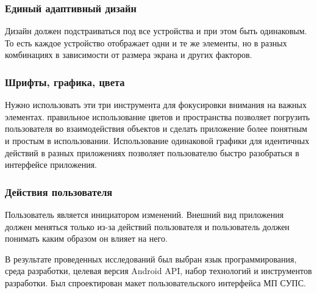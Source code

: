 \subsubsection*{Единый адаптивный дизайн}
Дизайн должен подстраиваться под все устройства и при этом быть одинаковым.
То есть каждое устройство отображает одни и те же элементы, но в разных комбинациях в зависимости от размера экрана и других факторов.

\subsubsection*{Шрифты, графика, цвета}
Нужно использовать эти три инструмента для фокусировки внимания на важных элементах.
правильное использование цветов и пространства позволяет погрузить пользователя во взаимодействия объектов и сделать приложение более понятным и простым в использовании.
Использование одинаковой графики для идентичных действий в разных приложениях позволяет пользователю быстро разобраться в интерфейсе приложения.

\subsubsection*{Действия пользователя}
Пользователь является инициатором изменений.
Внешний вид приложения должен меняться только из-за действий пользователя и пользователь должен понимать каким образом он влияет на него.

\conclusions
\label{sec:designConclusions}

В результате проведенных исследований был выбран язык программирования, среда разработки, целевая версия Android API, набор технологий и инструментов разработки.
Был спроектирован макет пользовательского интерфейса МП СУПС.
